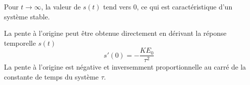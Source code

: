 Pour $t\to\infty$, la valeur de $s(t)$ tend vers 0, ce qui est caractéristique d'un système stable. 

La pente à l'origine peut être obtenue directement en dérivant la réponse temporelle $s(t)$
$$
s'(0)=-\dfrac{KE_0}{\tau^2}
$$
La pente à l'origine est négative et inversemment proportionnelle au carré de la constante de temps du système $\tau$.




